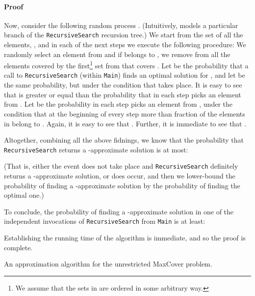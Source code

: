 \documentclass[11pt]{article}
\newenvironment{proof}{\paragraph{Proof}}{\hfill\medskip}
\begin{document}
\begin{proof}
  Now, consider the following random process . (Intuitively,
   models a particular branch of the \texttt{RecursiveSearch}
  recursion tree.)  We start from the set  of all the elements,
  , and in each of the next  steps we execute the following
  procedure: We randomly select an element  from  and if 
  belongs to , we remove from  all the elements covered by
  the first\footnote{We assume that the sets in  are ordered
    in some arbitrary way.} set from  that covers . Let
   be the probability that a call to \texttt{RecursiveSearch}
  (within \texttt{Main}) finds an optimal solution for , and let
   be the same probability, but under the condition that
   takes place.  It is easy to see that  is greater or
  equal than the probability that in each step  picks an
  element from .  Let  be the probability in each step
   picks an element from , under the condition that at the
  beginning of every step more than 
  fraction of the elements in  belong to . Again, it is easy
  to see that . Further, it is immediate
  to see that .

  Altogether, combining all the above fidnings, we know that the
  probability that \texttt{Re\-cur\-sive\-Search} returns a -approximate
  solution is at most:
  
  (That is, either the event  does not take place and
  \texttt{RecursiveSearch} definitely returns a -approximate
  solution, or  does occur, and then we lower-bound the
  probability of finding a -approximate solution by the
  probability of finding the optimal one.)

  To conclude, the probability of finding a -approximate
  solution in one of the 
  independent invocations of \texttt{RecursiveSearch} from
  \texttt{Main} is at least:
  
  Establishing the running time of the algorithm is immediate, and so
  the proof is complete.~
\end{proof}















\begin{algorithm}[t]
   \small
   \SetAlCapFnt{\small}
   \;
   \For{ \KwTo }{
       \;
      \;
      
   }
    \;
    \;
   \Return{}
   \caption{\small An approximation algorithm for the unrestricted MaxCover problem.}
   \label{alg:greedyAndExpo}
\end{algorithm}
\end{document}
